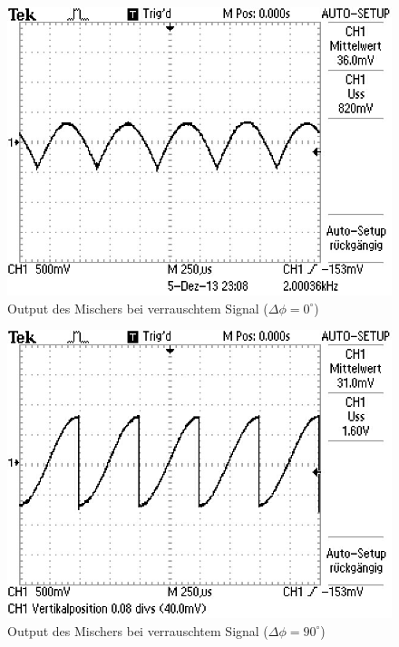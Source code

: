 \documentclass[11pt]{article}
\begin{document}
\begin{figure}[h]
\centering
\includegraphics[scale=0.85]{Bilder/5-noise-0.png}
\caption{Output des Mischers bei verrauschtem Signal ($\Delta\phi=0^\circ$)}
\label{Abb11}
\end{figure}

\begin{figure}[h]
\centering
\includegraphics[scale=0.85]{Bilder/5-noise-90.png}
\caption{Output des Mischers bei verrauschtem Signal ($\Delta\phi=90^\circ$)}
\label{Abb12}
\end{figure}
\end{document}
